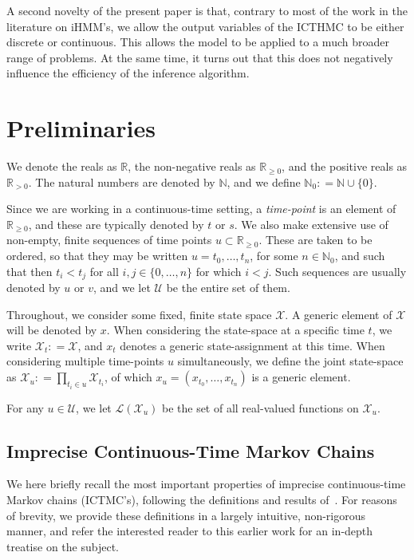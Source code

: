 \documentclass[twoside,11pt]{article}
\newcommand{\nats}{\mathbb{N}}
\newcommand{\natswith}{\nats_{0}}
\newcommand{\reals}{\mathbb{R}}
\newcommand{\realspos}{\reals_{>0}}
\newcommand{\realsnonneg}{\reals_{\geq 0}}
\newcommand{\states}{\mathcal{X}}
\newcommand{\gambles}{\mathcal{L}}
\newcommand{\coloneqq}{:\!=}
\begin{document}
A second novelty of the present paper is that, contrary to most of the work in the literature on iHMM's, we allow the output variables of the ICTHMC to be either discrete or continuous. This allows the model to be applied to a much broader range of problems. At the same time, it turns out that this does not negatively influence the efficiency of the inference algorithm.

\section{Preliminaries}\label{sec:prelim}

We denote the reals as $\reals$, the non-negative reals as $\realsnonneg$, and the positive reals as $\realspos$. The natural numbers are denoted by $\nats$, and we define $\natswith\coloneqq\nats\cup\{0\}$.

Since we are working in a continuous-time setting, a \emph{time-point} is an element of $\realsnonneg$, and these are typically denoted by $t$ or $s$. We also make extensive use of non-empty, finite sequences of time points $u\subset\realsnonneg$. These are taken to be ordered, so that they may be written $u=t_0,\ldots,t_n$, for some $n\in\natswith$, and such that then $t_i<t_j$ for all $i,j\in\{0,\ldots,n\}$ for which $i< j$. Such sequences are usually denoted by $u$ or $v$, and we let $\mathcal{U}$ be the entire set of them.

Throughout, we consider some fixed, finite state space $\states$. A generic element of $\states$ will be denoted by $x$. When considering the state-space at a specific time $t$, we write $\states_t\coloneqq\states$, and $x_t$ denotes a generic state-assignment at this time. When considering multiple time-points $u$ simultaneously, we define the joint state-space as $\states_u\coloneqq\prod_{t_i\in u}\states_{t_i}$, of which $x_u=(x_{t_0},\ldots,x_{t_n})$ is a generic element.

For any $u\in\mathcal{U}$, we let $\gambles(\states_u)$ be the set of all real-valued functions on $\states_u$.

\subsection{Imprecise Continuous-Time Markov Chains}\label{subsec:ictmc}

We here briefly recall the most important properties of imprecise continuous-time Markov chains (ICTMC's), following the definitions and results of~\citet{krak2016ictmc}. For reasons of brevity, we provide these definitions in a largely intuitive, non-rigorous manner, and refer the interested reader to this earlier work for an in-depth treatise on the subject.
\end{document}
